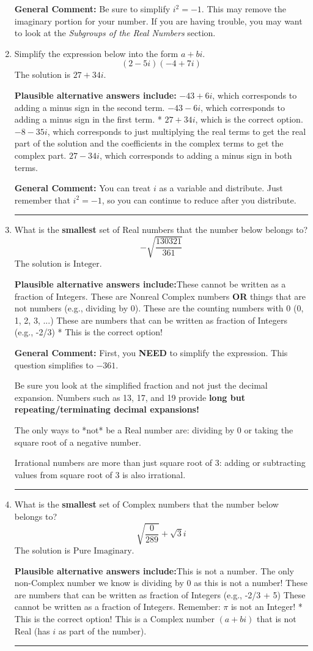\documentclass{extbook}[14pt]
\newcommand{\litem}[1]{\item #1

\rule{\textwidth}{0.4pt}}
\begin{document}
\begin{enumerate}
{\textbf{General Comment:} Be sure to simplify $i^2 = -1$. This may remove the imaginary portion for your number. If you are having trouble, you may want to look at the \textit{Subgroups of the Real Numbers} section.
}
\litem{
Simplify the expression below into the form $a+bi$.
\[ (2 - 5 i)(-4 + 7 i) \]The solution is \( 27 + 34 i \).\begin{enumerate}[label=\Alph*.]
\textbf{Plausible alternative answers include:} $-43 + 6 i$, which corresponds to adding a minus sign in the second term.
 $-43 - 6 i$, which corresponds to adding a minus sign in the first term.
* $27 + 34 i$, which is the correct option.
 $-8 - 35 i$, which corresponds to just multiplying the real terms to get the real part of the solution and the coefficients in the complex terms to get the complex part.
 $27 - 34 i$, which corresponds to adding a minus sign in both terms.
\end{enumerate}

\textbf{General Comment:} You can treat $i$ as a variable and distribute. Just remember that $i^2=-1$, so you can continue to reduce after you distribute.
}
\litem{
What is the \textbf{smallest} set of Real numbers that the number below belongs to?
\[ -\sqrt{\frac{130321}{361}} \]The solution is \( \text{Integer} \).\begin{enumerate}[label=\Alph*.]
\textbf{Plausible alternative answers include:}These cannot be written as a fraction of Integers.
These are Nonreal Complex numbers \textbf{OR} things that are not numbers (e.g., dividing by 0).
These are the counting numbers with 0 (0, 1, 2, 3, ...)
These are numbers that can be written as fraction of Integers (e.g., -2/3)
* This is the correct option!
\end{enumerate}

\textbf{General Comment:} First, you \textbf{NEED} to simplify the expression. This question simplifies to $-361$. 
 
 Be sure you look at the simplified fraction and not just the decimal expansion. Numbers such as 13, 17, and 19 provide \textbf{long but repeating/terminating decimal expansions!} 
 
 The only ways to *not* be a Real number are: dividing by 0 or taking the square root of a negative number. 
 
 Irrational numbers are more than just square root of 3: adding or subtracting values from square root of 3 is also irrational.
}
\litem{
What is the \textbf{smallest} set of Complex numbers that the number below belongs to?
\[ \sqrt{\frac{0}{289}}+\sqrt{3}i \]The solution is \( \text{Pure Imaginary} \).\begin{enumerate}[label=\Alph*.]
\textbf{Plausible alternative answers include:}This is not a number. The only non-Complex number we know is dividing by 0 as this is not a number!
These are numbers that can be written as fraction of Integers (e.g., -2/3 + 5)
These cannot be written as a fraction of Integers. Remember: $\pi$ is not an Integer!
* This is the correct option!
This is a Complex number $(a+bi)$ that is not Real (has $i$ as part of the number).
\end{enumerate}

}
\end{enumerate}
\end{document}
